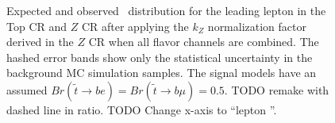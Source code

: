 \begin{figure}
  \centering
  \caption{
    Expected and observed \pt\ distribution for the leading lepton in
    the Top CR and $Z$ CR after applying the $k_Z$ normalization factor derived
    in the $Z$ CR when all flavor channels are combined.
    The hashed error bands show only the statistical uncertainty in the
    background MC simulation samples.
    The signal models have an assumed
    $Br(\tilde{t}\rightarrow be) = Br(\tilde{t}\rightarrow b\mu) = 0.5$.
    {\color{red} TODO remake with dashed line in ratio.}
    {\color{red} TODO Change x-axis to ``lepton \pt''.}
  }
  \label{fig:cr_lep_pt_0__w_norm_factor}
\end{figure}

